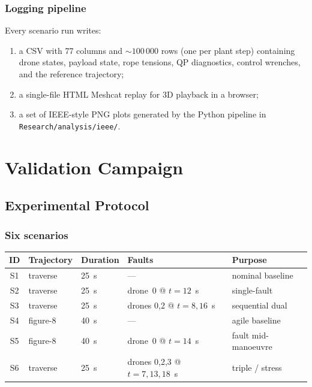 \documentclass[11pt,a4paper,oneside]{report}
\begin{document}
\section{Logging pipeline}

Every scenario run writes:
\begin{enumerate}
\item a CSV with 77 columns and $\sim 100\,000$ rows (one per plant
step) containing drone states, payload state, rope tensions, QP
diagnostics, control wrenches, and the reference trajectory;
\item a single-file HTML Meshcat replay for 3D playback in a browser;
\item a set of IEEE-style PNG plots generated by the Python pipeline
in \texttt{Research/analysis/ieee/}.
\end{enumerate}

\part{Validation Campaign}

\chapter{Experimental Protocol}
\label{chap:protocol}

\section{Six scenarios}
\label{sec:campaign-scenarios}

\begin{longtable}{>{\ttfamily}c l l l l}
\toprule
\textbf{ID} & \textbf{Trajectory} & \textbf{Duration} &
\textbf{Faults} & \textbf{Purpose} \\
\midrule
S1 & traverse & 25~s & --- & nominal baseline \\
S2 & traverse & 25~s & drone~0 @ $t=12$~s & single-fault \\
S3 & traverse & 25~s & drones 0,2 @ $t=8,16$~s & sequential dual \\
S4 & figure-8 & 40~s & --- & agile baseline \\
S5 & figure-8 & 40~s & drone~0 @ $t=14$~s & fault mid-manoeuvre \\
S6 & traverse & 25~s & drones 0,2,3 @ $t=7,13,18$~s
   & triple / stress \\
\bottomrule
\end{longtable}
\end{document}
